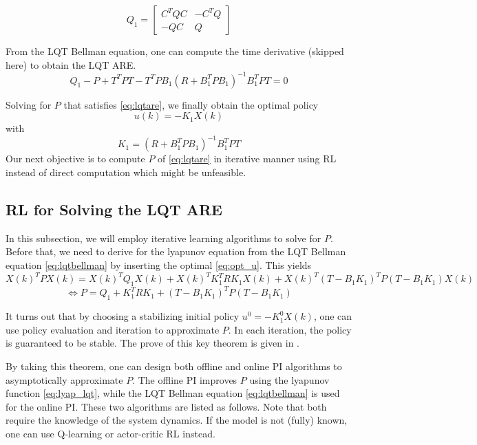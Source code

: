 \begin{equation}
Q_1 = \left[ \begin{array}{cc}
C^TQC & -C^TQ \\ 
-QC & Q
\end{array} \right] 
\end{equation}

From the LQT Bellman equation, one can compute the time derivative (skipped here) to obtain the LQT ARE.
\begin{equation}
\label{eq:lqtare}
Q_1 - P + T^TPT - T^TPB_1(R+B_1^TPB_1)^{-1}B_1^TPT = 0
\end{equation}

Solving for $P$ that satisfies \eqref{eq:lqtare}, we finally obtain the optimal policy 
\begin{equation}
\label{eq:opt_u}
u(k) = -K_1X(k)
\end{equation}
with
\begin{equation}
K_1 = (R+B_1^TPB_1)^{-1}B_1^TPT
\end{equation}
Our next objective is to compute $P$ of \eqref{eq:lqtare} in iterative manner using \ac {RL} instead of direct computation which might be unfeasible. 

\subsection{\ac{RL} for Solving the LQT ARE}
In this subsection, we will employ iterative learning algorithms to solve for $P$. Before that, we need to derive for the lyapunov equation from the LQT Bellman equation \eqref{eq:lqtbellman} by inserting the optimal \eqref{eq:opt_u}. This yields
\begin{equation*}
X(k)^TPX(k) =  X(k)^TQ_1X(k) + X(k)^TK_1^TRK_1X(k) + X(k)^T(T - B_1K_1)^TP(T - B_1K_1)X(k)
\end{equation*}
\begin{equation}
\label{eq:lyap_lqt}
\Leftrightarrow  P =  Q_1 + K_1^TRK_1 + (T - B_1K_1)^TP(T - B_1K_1)
\end{equation}

It turns out that by choosing a stabilizing initial policy $u^0 = -K_1^0X(k)$, one can use policy evaluation and iteration to approximate $ P $. In each iteration, the policy is guaranteed to be stable. The prove of this key theorem is given in \cite{1099755}. 

By taking this theorem, one can design both offline and online \ac{PI} algorithms to asymptotically approximate $P$. The offline \ac{PI} improves $P$ using the lyapunov function \eqref{eq:lyap_lqt}, while the LQT Bellman equation \eqref{eq:lqtbellman} is used for the online \ac{PI}. These two algorithms are listed as follows. Note that both require the knowledge of the system dynamics. If the model is not (fully) known, one can use Q-learning \cite{Kiumarsi20141167} or actor-critic \ac {RL} \cite{Modares20141780} instead. 

